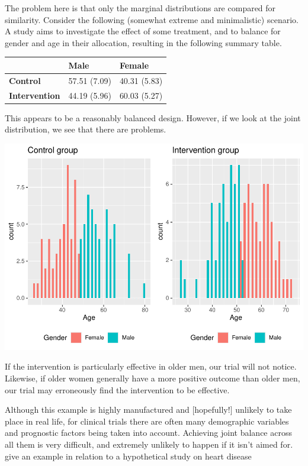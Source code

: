 \documentclass[
  openany]{book}
\theoremstyle{definition}
\theoremstyle{definition}
\theoremstyle{definition}
\theoremstyle{definition}
\theoremstyle{remark}
\begin{document}
The problem here is that only the marginal distributions are compared for similarity. Consider the following (somewhat extreme and minimalistic) scenario. A study aims to investigate the effect of some treatment, and to balance for gender and age in their allocation, resulting in the following summary table.

\begin{tabular}{>{}l|l|l}
\hline
  & Male & Female\\
\hline
\textbf{Control} & 57.51 (7.09) & 40.31 (5.83)\\
\hline
\textbf{Intervention} & 44.19 (5.96) & 60.03 (5.27)\\
\hline
\end{tabular}

This appears to be a reasonably balanced design. However, if we look at the joint distribution, we see that there are problems.

\includegraphics{CT4H_notes_files/figure-latex/unnamed-chunk-10-1.pdf}

If the intervention is particularly effective in older men, our trial will not notice. Likewise, if older women generally have a more positive outcome than older men, our trial may erroneously find the intervention to be effective.

Although this example is highly manufactured and {[}hopefully!{]} unlikely to take place in real life, for clinical trials there are often many demographic variables and prognostic factors being taken into account. Achieving joint balance across all them is very difficult, and extremely unlikely to happen if it isn't aimed for. \citet{treasure1998minimisation} give an example in relation to a hypothetical study on heart disease
\end{document}
